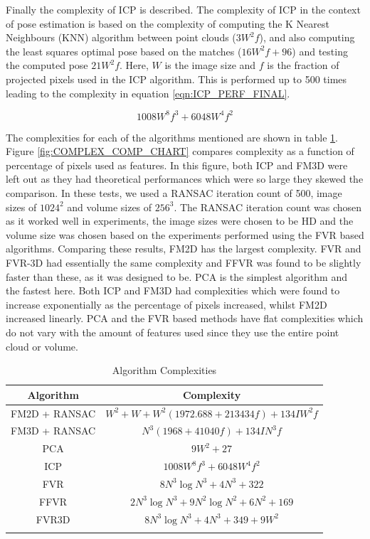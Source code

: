 Finally the complexity of ICP is described. The complexity of ICP in the context of pose estimation is based on the complexity of computing the K Nearest Neighbours (KNN) algorithm between point clouds ($3W^2f$), and also computing the least squares optimal pose based on the matches ($16W^2f + 96$) and testing the computed pose $21W^2f$. Here, $W$ is the image size and $f$ is the fraction of projected pixels used in the ICP algorithm. This is performed up to 500 times leading to the complexity in equation \ref{eqn:ICP_PERF_FINAL}.

\begin{equation} \label{eqn:ICP_PERF_FINAL}
1008W^8f^3 + 6048W^4f^2
\end{equation}

The complexities for each of the algorithms mentioned are shown in table \ref{table:ALG_COMPLEX_TBL}. Figure \ref{fig:COMPLEX_COMP_CHART} compares complexity as a function of percentage of pixels used as features. In this figure, both ICP and FM3D were left out as they had theoretical performances which were so large they skewed the comparison. In these tests, we used a RANSAC iteration count of 500, image sizes of $1024^2$ and volume sizes of $256^3$. The RANSAC iteration count was chosen as it worked well in experiments, the image sizes were chosen to be HD and the volume size was chosen based on the experiments performed using the FVR based algorithms. Comparing these results, FM2D has the largest complexity. FVR and FVR-3D had essentially the same complexity and FFVR was found to be slightly faster than these, as it was designed to be. PCA is the simplest algorithm and the fastest here. Both ICP and FM3D had complexities which were found to increase exponentially as the percentage of pixels increased, whilst FM2D increased linearly. PCA and the FVR based methods have flat complexities which do not vary with the amount of features used since they use the entire point cloud or volume. \\

\begin{table}[!t]
\label{table:ALG_COMPLEX_TBL}
\centering
\begin{tabular}{cc}\hline
\textbf{Algorithm} & \textbf{Complexity}\\ \hline
FM2D + RANSAC & $W^2 + W + W^2(1972.688 + 213434f) + 134IW^2f$\\
FM3D + RANSAC & $N^3(1968 + 41040f) + 134IN^3f$\\
PCA & $9W^2 + 27$\\
ICP & $1008W^8f^3 + 6048W^4f^2$\\
FVR & $8N^3\log{N^3} + 4N^3 + 322$\\
FFVR & $2N^3\log{N^3} + 9N^2\log{N^2} + 6N^2 + 169$\\
FVR3D & $8N^3\log{N^3} + 4N^3 + 349 + 9W^2$\\
\\
\end{tabular}
\\[10pt]
\caption{Algorithm Complexities}
\end{table}



